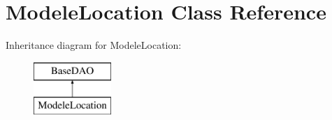 \hypertarget{class_modele_location}{}\section{Modele\+Location Class Reference}
\label{class_modele_location}
Inheritance diagram for Modele\+Location\+:\begin{figure}[H]
\begin{center}
\leavevmode
\includegraphics[height=2.000000cm]{class_modele_location}
\end{center}
\end{figure}
